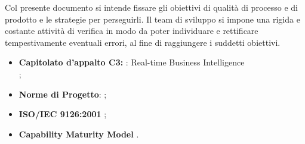 
	
		Col presente documento si intende fissare gli obiettivi di qualità di processo e di prodotto e le strategie per perseguirli. 
		Il team di sviluppo si impone una rigida e costante attività di verifica in modo da poter individuare e 
		rettificare tempestivamente eventuali errori, al fine di raggiungere i suddetti obiettivi.
		
	


			\begin{itemize}
				\item \textbf{Capitolato d'appalto C3:} \projectname{}: Real-time Business Intelligence \\
					;
				\item \textbf{Norme di Progetto}: ;
				\item \textbf{ISO/IEC 9126:2001} ;
				\item \textbf{Capability Maturity Model} .
			\end{itemize}
		

